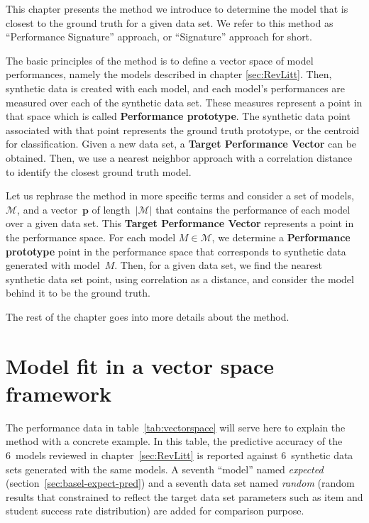 \label{sec:Approach}

This chapter presents the method we introduce to determine the model that is closest to the ground truth for a given data set.  We refer to this method as ``Performance Signature'' approach, or ``Signature'' approach for short. 

The basic principles of the method is to define a vector space of model performances, namely the models described in chapter \ref{sec:RevLitt}.  Then, synthetic data is created with each model, and each model's performances are measured over each of the synthetic data set.  These measures represent a point in that space which is called \textbf{Performance prototype}. The synthetic data point associated with that point represents the ground truth prototype, or the centroid for classification.  Given a new data set, a \textbf{Target Performance Vector} can be obtained. Then, we use a nearest neighbor approach with a correlation distance to identify the closest ground truth model.

Let us rephrase the method in more specific terms and consider a set of models, $\mathcal{M}$, and a vector~$\mathbf{p}$ of length~$|\mathcal{M}|$ that contains the performance of each model over a given data set.  This \textbf{Target Performance Vector} represents a point in the performance space.  For each model $M \in \mathcal{M}$, we determine a \textbf{Performance prototype} point in the performance space that corresponds to synthetic data generated with model~$M$.  Then, for a given data set, we find the nearest synthetic data set point, using correlation as a distance, and consider the model behind it to be the ground truth.


The rest of the chapter goes into more details about the method.

\section{Model fit in a vector space framework}

The performance data in table~\ref{tab:vectorspace} will serve here to explain the method with a concrete example.  In this table, the predictive accuracy of the 6~models reviewed in chapter~\ref{sec:RevLitt} is reported against 6~synthetic data sets generated with the same models.  A seventh ``model'' named \textit{expected} (section~\ref{sec:basel-expect-pred}) and a seventh data set named \textit{random} (random results that constrained to reflect the target data set parameters such as item and student success rate distribution) are added for comparison purpose.  


